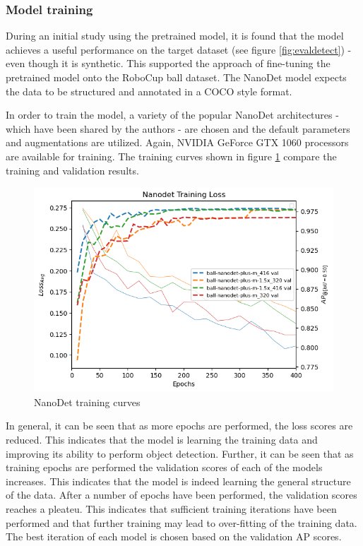 \documentclass[a4paper,twoside,12pt]{report}
\begin{document}
\subsubsection{Model training}

During an initial study using the pretrained model, it is found that the model achieves a useful performance on the target dataset (see figure \ref{fig:evaldetect}) - even though it is synthetic. This supported the approach of fine-tuning the pretrained model onto the RoboCup ball dataset. The NanoDet model expects the data to be structured and annotated in a COCO style format. 

In order to train the model, a variety of the popular NanoDet architectures - which have been shared by the authors - are chosen and the default parameters and augmentations are utilized. Again, NVIDIA GeForce GTX 1060 processors are available for training. The training curves shown in figure \ref{fig:nanodet_train} compare the training and validation results.

\begin{figure}[h!]
\begin{center}
\includegraphics[width=13cm]{images/nanodet_train.png}
\caption{NanoDet training curves}
\label{fig:nanodet_train}
\end{center}
\end{figure}

In general, it can be seen that as more epochs are performed, the loss scores are reduced. This indicates that the model is learning the training data and improving its ability to perform object detection. Further, it can be seen that as training epochs are performed the validation scores of each of the models increases. This indicates that the model is indeed learning the general structure of the data. After a number of epochs have been performed, the validation scores reaches a pleateu. This indicates that sufficient training iterations have been performed and that further training may lead to over-fitting of the training data. The best iteration of each model is chosen based on the validation AP scores. 
\end{document}

